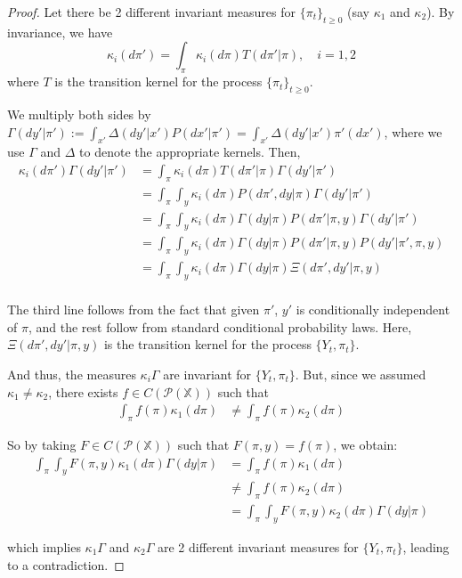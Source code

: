 \documentclass{article}
\begin{document}
\begin{proof}
    Let there be 2 different invariant measures for \( \{\pi_t\}_{t\ge0} \) (say \(\kappa_1\) and \(\kappa_2\)). By invariance, we have
    \[ \kappa_i(d\pi') = \int_\pi \kappa_i(d\pi)T(d\pi' | \pi), \quad i=1,2 \]
    where \( T \) is the transition kernel for the process \( \{\pi_t\}_{t\ge0} \).

    We multiply both sides by \( \Gamma(dy'|\pi') := \int_{x'} \Delta(dy' | x')P(dx' | \pi') = \int_{x'} \Delta(dy' | x')\pi'(dx') \), where we use \( \Gamma \) and \( \Delta \) to denote the appropriate kernels. Then,
    \begin{align*}
        \kappa_i(d\pi')\Gamma(dy'|\pi') & = \int_\pi \kappa_i(d\pi)T(d\pi' | \pi)\Gamma(dy'|\pi')                              \\
                                        & = \int_\pi \int_y \kappa_i(d\pi)P(d\pi',dy | \pi)\Gamma(dy'|\pi')                    \\
                                        & = \int_\pi \int_y \kappa_i(d\pi)\Gamma(dy | \pi)P(d\pi' | \pi, y)\Gamma(dy'|\pi')    \\
                                        & = \int_\pi \int_y \kappa_i(d\pi)\Gamma(dy | \pi)P(d\pi' | \pi, y)P(dy'|\pi', \pi, y) \\
                                        & = \int_\pi \int_y \kappa_i(d\pi)\Gamma(dy | \pi)\Xi(d\pi', dy' | \pi, y)             \\
    \end{align*}

    The third line follows from the fact that given \(\pi'\), \( y' \) is conditionally independent of \( \pi \), and the rest follow from standard conditional probability laws. Here, \( \Xi(d\pi', dy' | \pi, y) \) is the transition kernel for the process \( \{Y_t, \pi_t\} \).

    And thus, the measures \( \kappa_i \Gamma \) are invariant for \( \{Y_t, \pi_t\} \). But, since we assumed \(\kappa_1 \neq \kappa_2 \), there exists \( f \in C(\mathcal{P}(\mathbb{X})) \) such that
    \begin{align*}
        \int_\pi f(\pi)\kappa_1(d\pi) & \neq \int_\pi f(\pi)\kappa_2(d\pi)
    \end{align*}

    So by taking \( F \in C(\mathcal{P}(\mathbb{X})) \) such that \( F(\pi,y) = f(\pi) \), we obtain:
    \begin{align*}
        \int_\pi \int_y F(\pi,y)\kappa_1(d\pi)\Gamma(dy|\pi) & = \int_\pi f(\pi)\kappa_1(d\pi)                        \\
                                                             & \neq \int_\pi f(\pi)\kappa_2(d\pi)                     \\
                                                             & = \int_\pi \int_y F(\pi,y)\kappa_2(d\pi)\Gamma(dy|\pi)
    \end{align*}

    which implies \( \kappa_1\Gamma \) and \( \kappa_2\Gamma \) are 2 different invariant measures for \( \{Y_t, \pi_t\} \), leading to a contradiction.
\end{proof}
\end{document}
